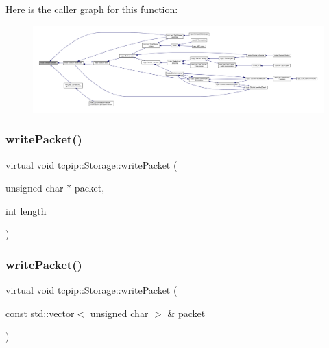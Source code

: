Here is the caller graph for this function\+:\nopagebreak
\begin{figure}[H]
\begin{center}
\leavevmode
\includegraphics[width=350pt]{classtcpip_1_1_storage_a1babffd3cee462277796bc5b4ef6bb1a_icgraph}
\end{center}
\end{figure}
\mbox{\label{classtcpip_1_1_storage_ae5c91a96be8c103708273d3f79855fa8}} 
\subsubsection{\texorpdfstring{write\+Packet()}{writePacket()}\hspace{0.1cm}{\footnotesize\ttfamily [1/2]}}
{\footnotesize\ttfamily virtual void tcpip\+::\+Storage\+::write\+Packet (\begin{DoxyParamCaption}\item[{unsigned char $\ast$}]{packet,  }\item[{int}]{length }\end{DoxyParamCaption})\hspace{0.3cm}{\ttfamily [virtual]}}

\mbox{\label{classtcpip_1_1_storage_abaf8bd3dd89102ea18f5cd85bc67b91c}} 
\subsubsection{\texorpdfstring{write\+Packet()}{writePacket()}\hspace{0.1cm}{\footnotesize\ttfamily [2/2]}}
{\footnotesize\ttfamily virtual void tcpip\+::\+Storage\+::write\+Packet (\begin{DoxyParamCaption}\item[{const std\+::vector$<$ unsigned char $>$ \&}]{packet }\end{DoxyParamCaption})\hspace{0.3cm}{\ttfamily [virtual]}}

